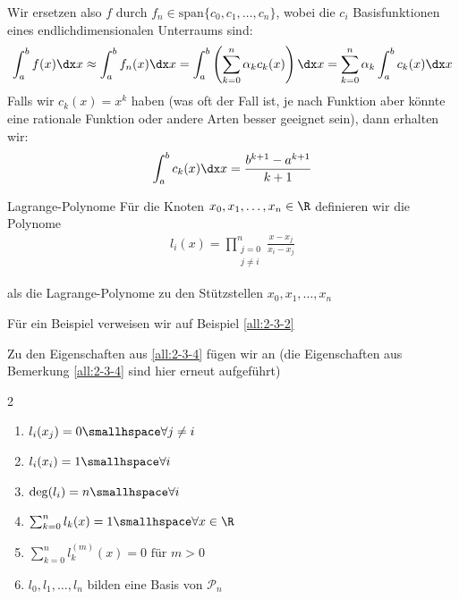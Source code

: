 Wir ersetzen also $f$ durch $f_n \in \text{span} \{ c_0, c_1, \ldots, c_n \}$, wobei die $c_i$ Basisfunktionen eines endlichdimensionalen Unterraums sind:
\rmvspace
\begin{align*}
    \int_{a}^{b} f(x) \dx x \approx \int_{a}^{b} f_n(x) \dx x = \int_{a}^{b} \left( \sum_{k = 0}^{n} \alpha_k c_k(x) \right) \dx x = \sum_{k = 0}^{n} \alpha_k \int_{a}^{b} c_k(x) \dx x
\end{align*}
Falls wir $c_k(x) = x^k$ haben (was oft der Fall ist, je nach Funktion aber könnte eine rationale Funktion oder andere Arten besser geeignet sein), dann erhalten wir:
\rmvspace
\begin{align*}
    \int_{a}^{b} c_k(x) \dx x = \frac{b^{k + 1} - a^{k + 1}}{k + 1}
\end{align*}

\begin{definition}[]{Lagrange-Polynome}
    Für die Knoten $x_0, x_1, \ldots, x_n \in \R$ definieren wir die Polynome
    \rmvspace
    \begin{align*}
        l_i(x) = \prod_{\substack{j = 0\\ j \neq i}}^n \frac{x - x_j}{x_i - x_j}
    \end{align*}

    \rmvspace
    als die Lagrange-Polynome zu den Stützstellen $x_0, x_1, \ldots, x_n$
\end{definition}
Für ein Beispiel verweisen wir auf Beispiel \ref{all:2-3-2}

 Zu den Eigenschaften aus \ref{all:2-3-4} fügen wir an (die Eigenschaften aus Bemerkung \ref{all:2-3-4} sind hier erneut aufgeführt)
\begin{multicols}{2}
    \begin{enumerate}
        \item $l_i(x_j) = 0 \smallhspace \forall j \neq i$
        \item $l_i(x_i) = 1 \smallhspace \forall i$
        \item $\deg(l_i) = n \smallhspace \forall i$
        \item $\sum_{k = 0}^{n} l_k(x) = 1 \smallhspace \forall x \in \R$
        \item $\sum_{k = 0}^{n} l_k^{(m)}(x) = 0 \text{ für } m > 0$
        \item $l_0, l_1, \ldots, l_n$ bilden eine Basis von $\mathcal{P}_{n}$
    \end{enumerate}
\end{multicols}

